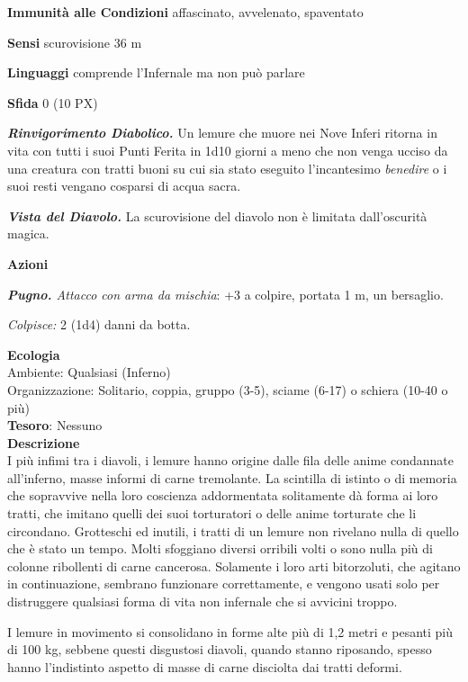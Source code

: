 \begin{multicols}{2}
	\textbf{Immunità alle Condizioni} affascinato, avvelenato, spaventato

	\textbf{Sensi} scurovisione 36 m

	\textbf{Linguaggi} comprende l'Infernale ma non può parlare

	\textbf{Sfida} 0 (10 PX)

	\textit{\textbf{Rinvigorimento Diabolico.}} Un lemure che muore nei Nove Inferi ritorna in vita con tutti i suoi Punti Ferita in 1d10 giorni a meno che non venga ucciso da una creatura con tratti buoni su cui sia stato eseguito l'incantesimo \textit{benedire} o i suoi resti vengano
	cosparsi di acqua sacra.

	\textit{\textbf{Vista del Diavolo.}} La scurovisione del diavolo non è limitata dall'oscurità magica.

	\textbf{Azioni}

	\textit{\textbf{Pugno.} Attacco con arma da mischia}: +3 a colpire, portata 1 m, un bersaglio.

	\textit{Colpisce:} 2 (1d4) danni da botta.

	\textbf{Ecologia}\\
	Ambiente: Qualsiasi (Inferno)\\
	Organizzazione: Solitario, coppia, gruppo (3-5), sciame (6-17) o schiera (10-40 o più)\\
	\textbf{Tesoro}: Nessuno\\
	\textbf{Descrizione}\\
	I più infimi tra i diavoli, i lemure hanno origine dalle fila delle anime condannate all'inferno, masse informi di carne tremolante. La scintilla di istinto o di memoria che sopravvive nella loro coscienza addormentata solitamente dà forma ai loro tratti, che imitano quelli dei suoi torturatori o delle anime torturate che li circondano. Grotteschi ed inutili, i tratti di un lemure non rivelano nulla di quello che è stato un tempo. Molti sfoggiano diversi orribili volti o sono nulla più di colonne ribollenti di carne cancerosa. Solamente i loro arti bitorzoluti, che agitano in continuazione, sembrano funzionare correttamente, e vengono usati solo per distruggere qualsiasi forma di vita non infernale che si avvicini troppo.

	I lemure in movimento si consolidano in forme alte più di 1,2 metri e pesanti più di 100 kg, sebbene questi disgustosi diavoli, quando stanno riposando, spesso hanno l'indistinto aspetto di masse di carne disciolta dai tratti deformi.


\end{multicols}
